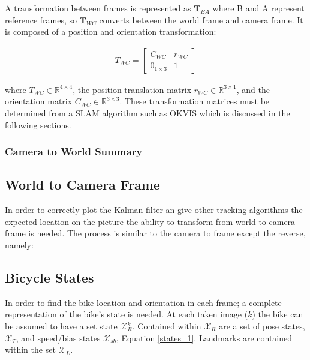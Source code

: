 \documentclass[a4paper,11pt,notitlepage]{article}
\begin{document}
A transformation between frames is represented as $\textbf{T}_{BA}$ where B and A represent reference frames, so $\textbf{T}_{WC}$ converts between the world frame and camera frame. It is composed of a position and orientation transformation:

\begin{equation}
\begin{aligned}
T_{WC} = 
\begin{bmatrix}
C_{WC} & r_{WC} \\
0_{1 \times 3} & 1
\end{bmatrix}
\end{aligned}
\end{equation}

where $T_{WC} \in \mathbb{R}^{4 \times 4}$, the position translation matrix $r_{WC} \in \mathbb{R}^{3 \times 1}$, and the orientation matrix $C_{WC} \in \mathbb{R}^{3 \times 3}$. These transformation matrices must be determined from a SLAM algorithm such as OKVIS which is discussed in the following sections.

\subsubsection{Camera to World Summary}



\subsection{World to Camera Frame} \label{w_c_frame}

In order to correctly plot the Kalman filter an give other tracking algorithms the expected location on the picture the ability to transform from world to camera frame is needed. The process is similar to the camera to frame except the reverse, namely:


\subsection{Bicycle States}

In order to find the bike location and orientation in each frame; a complete representation of the bike's state is needed. At each taken image ($k$) the bike can be assumed to have a set state $\mathcal{X}_{R}^{k}$. Contained within $\mathcal{X}_{R}$ are a set of pose states, $\mathcal{X}_{T}$, and speed/bias states $\mathcal{X}_{sb}$, Equation \ref{states_1}. Landmarks are contained within the set $\mathcal{X}_{L}$.
\end{document}
